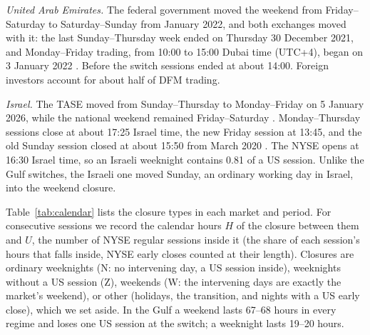 \emph{United Arab Emirates.} The federal government moved the weekend from Friday--Saturday to Saturday--Sunday from January 2022, and both exchanges moved with it: the last Sunday--Thursday week ended on Thursday 30 December 2021, and Monday--Friday trading, from 10:00 to 15:00 Dubai time (UTC+4), began on 3 January 2022 \citep{National2021}. Before the switch sessions ended at about 14:00. Foreign investors account for about half of DFM trading.

\emph{Israel.} The TASE moved from Sunday--Thursday to Monday--Friday on 5 January 2026, while the national weekend remained Friday--Saturday \citep{TASE2025}. Monday--Thursday sessions close at about 17:25 Israel time, the new Friday session at 13:45, and the old Sunday session closed at about 15:50 from March 2020 \citep{WFE2020}. The NYSE opens at 16:30 Israel time, so an Israeli weeknight contains 0.81 of a US session. Unlike the Gulf switches, the Israeli one moved Sunday, an ordinary working day in Israel, into the weekend closure.

Table~\ref{tab:calendar} lists the closure types in each market and period. For consecutive sessions we record the calendar hours $H$ of the closure between them and $U$, the number of NYSE regular sessions inside it (the share of each session's hours that falls inside, NYSE early closes counted at their length). Closures are ordinary weeknights (N: no intervening day, a US session inside), weeknights without a US session (Z), weekends (W: the intervening days are exactly the market's weekend), or other (holidays, the transition, and nights with a US early close), which we set aside. In the Gulf a weekend lasts 67--68 hours in every regime and loses one US session at the switch; a weeknight lasts 19--20 hours.

